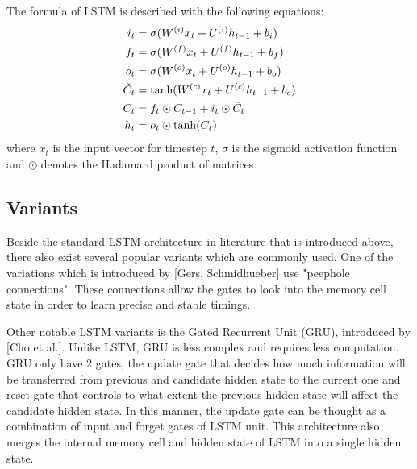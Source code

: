 \documentclass[12pt]{extarticle}
\begin{document}
The formula of LSTM is described with the following equations:
\begin{align*}
i_{t} &= \sigma(W^{(i)}x_{t} + U^{(i)}h_{t-1} + b_{i}) \\
f_{t} &= \sigma(W^{(f)}x_{t} + U^{(f)}h_{t-1} + b_{f}) \\
o_{t} &= \sigma(W^{(o)}x_{t} + U^{(o)}h_{t-1} + b_{o}) \\
\tilde{C}_{t} &= \textnormal{tanh}(W^{(c)}x_{t} + U^{(c)}h_{t-1} + b_{c}) \\
C_{t} &= f_{t} \odot C_{t-1} + i_{t} \odot \tilde{C}_{t} \\
h_{t} &= o_{t} \odot \textnormal{tanh}(C_{t})
\end{align*}
where $x_{t}$ is the input vector for timestep $t$, $\sigma$ is the sigmoid activation function and $\odot$ denotes the Hadamard product of matrices. 

\subsection*{Variants}
Beside the standard LSTM architecture in literature that is introduced above, there also exist several popular variants which are commonly used. One of the variations which is introduced by [Gers, Schmidhueber] use "peephole connections". These connections allow the gates to look into the memory cell state in order to learn precise and stable timings. 

Other notable LSTM variants is the Gated Recurrent Unit (GRU), introduced by [Cho et al.]. Unlike LSTM, GRU is less complex and requires less computation. GRU only have 2 gates, the update gate that decides how much information will be transferred from previous and candidate hidden state to the current one and reset gate that controls to what extent the previous hidden state will affect the candidate hidden state. In this manner, the update gate can be thought as a combination of input and forget gates of LSTM unit. This architecture also merges the internal memory cell and hidden state of LSTM into a single hidden state.

\end{document}
